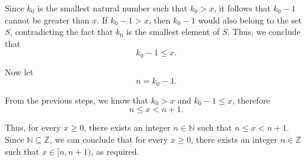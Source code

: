 \documentclass{article}
\begin{document}
Since \( k_0 \) is the smallest natural number such that \( k_0 > x \), it follows that \( k_0 - 1 \) cannot be greater than \( x \). If \( k_0 - 1 > x \), then \( k_0 - 1 \) would also belong to the set \( S \), contradicting the fact that \( k_0 \) is the smallest element of \( S \). Thus, we conclude that
\[
    k_0 - 1 \leq x.
\]
\vspace{-0.5\baselineskip}

Now let
\[
n = k_0 - 1.
\]
\vspace{-0.5\baselineskip}

From the previous steps, we know that \( k_0 > x \) and \( k_0 - 1 \leq x \), therefore
\[
n \leq x < n + 1.
\]
\vspace{-0.5\baselineskip}

Thus, for every \( x \geq 0 \), there exists an integer \( n \in \mathbb{N} \) such that \( n \leq x < n + 1 \). Since \( \mathbb{N} \subseteq \mathbb{Z} \), we can conclude that for every \( x \geq 0 \), there exists an integer \( n \in \mathbb{Z} \) such that \( x \in [n, n+1) \), as required.

\printbibliography
\end{document}
